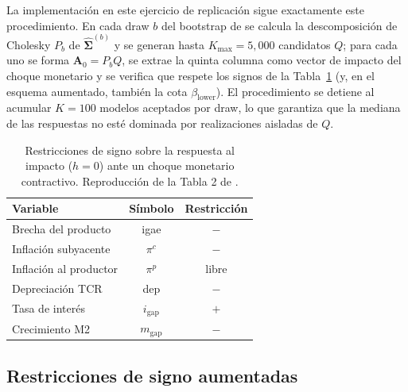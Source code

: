 \documentclass[12pt,a4paper]{article}
\newcommand{\blower}{\beta_{\text{lower}}}
\begin{document}
La implementación en este ejercicio de replicación sigue exactamente este
procedimiento. En cada draw $b$ del bootstrap de \citet{runkle1987} se calcula la
descomposición de Cholesky $P_b$ de $\widehat{\boldsymbol{\Sigma}}^{(b)}$ y se generan hasta
$K_{\max} = 5{,}000$ candidatos $Q$; para cada uno se forma $\mathbf{A}_0 = P_b Q$, se
extrae la quinta columna como vector de impacto del choque monetario y se verifica que
respete los signos de la Tabla~\ref{tab:sign_restr} (y, en el esquema aumentado, también
la cota $\blower$). El procedimiento se detiene al acumular $K = 100$ modelos aceptados
por draw, lo que garantiza que la mediana de las respuestas no esté dominada por
realizaciones aisladas de $Q$.

\begin{table}[H]
    \centering
    \caption{Restricciones de signo sobre la respuesta al impacto ($h=0$)
    ante un choque monetario contractivo. Reproducción de la Tabla 2 de
    \citet{carrilloelizondo2018}.}
    \label{tab:sign_restr}
    \begin{tabular}{lcc}
        \toprule
        Variable & Símbolo & Restricción \\
        \midrule
        Brecha del producto    & igae          & $-$ \\
        Inflación subyacente   & $\pi^c$       & $-$ \\
        Inflación al productor & $\pi^p$       & libre \\
        Depreciación TCR       & dep           & $-$ \\
        Tasa de interés        & $i_{\text{gap}}$ & $+$ \\
        Crecimiento M2         & $m_{\text{gap}}$ & $-$ \\
        \bottomrule
    \end{tabular}
\end{table}

\subsection{Restricciones de signo aumentadas}
\end{document}
